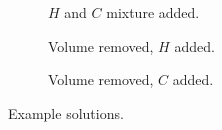 \documentclass{article}
\begin{document}
\begin{figure}
    \begin{center}
        \begin{subfigure}{0.48\textwidth}
            \caption{$H$ and $C$ mixture added.}
        \end{subfigure}
        \vspace{1em}

        \begin{subfigure}{0.48\textwidth}
            \caption{Volume removed, $H$ added.}
        \end{subfigure}
        \begin{subfigure}{0.48\textwidth}
            \caption{Volume removed, $C$ added.}
        \end{subfigure}
    \end{center}
    \caption{%
        Example solutions.
    }
\end{figure}


\end{document}
